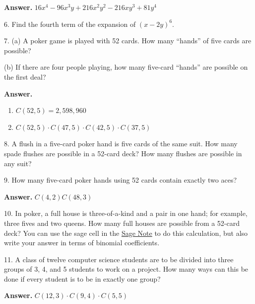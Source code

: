 \documentclass[10pt,]{book}
\theoremstyle{plain}
\theoremstyle{definition}
\theoremstyle{definition}
\theoremstyle{definition}
\begin{document}
\begin{exercisegroup}
\par\smallskip
\par\smallskip
\noindent\textbf{Answer.}\hypertarget{answer-24}{}\quad
 \(16x^4-96x ^3y+216x^2y^2-216x y^3+81y^4\)%
\item[6.]\hypertarget{exercise-48}{}Find the fourth term of the expansion of \((x -2y)^6\).%
\par\smallskip
\item[7.]\hypertarget{exercise-49}{}(a) A poker game is played with 52 cards. How many ``hands'' of five cards are possible?%
\par
(b) If there are four people playing, how many five-card ``hands'' are possible on the first deal?%
\par\smallskip
\par\smallskip
\noindent\textbf{Answer.}\hypertarget{answer-25}{}\quad
\leavevmode%
\begin{enumerate}[label=\alph*]
\item\hypertarget{li-63}{} \(C(52,5)=2,598,960\)%
\item\hypertarget{li-64}{}  \(C(52,5)\cdot C(47,5)\cdot C(42,5)\cdot C(37,5)\)%
\end{enumerate}
%
\item[8.]\hypertarget{exercise-50}{} A flush in a five-card poker hand is five cards of the same suit. How many spade flushes are possible in a 52-card deck? How many flushes are possible in any suit?%
\par\smallskip
\item[9.]\hypertarget{exercise-51}{} How many five-card poker hands using 52 cards contain exactly two aces?%
\par\smallskip
\par\smallskip
\noindent\textbf{Answer.}\hypertarget{answer-26}{}\quad
\(C(4,2)C(48,3)\)%
\item[10.]\hypertarget{exercise-52}{}  In poker, a full house is three-of-a-kind and a pair in one hand; for example, three fives and two queens. How many full houses are possible from a 52-card deck?  You can use the sage cell in the \hyperref[sage-bridge-hands]{Sage Note} to do this calculation, but also write your answer in terms of binomial coefficients. %
\par\smallskip
\item[11.]\hypertarget{exercise-53}{} A class of twelve computer science students are to be divided into three groups of 3, 4, and 5 students to work on a project. How many ways can this be done if every student is to be in exactly one group?%
\par\smallskip
\par\smallskip
\noindent\textbf{Answer.}\hypertarget{answer-27}{}\quad
\(C(12,3)\cdot C(9,4)\cdot C(5,5)\)%
\end{exercisegroup}
\end{document}
